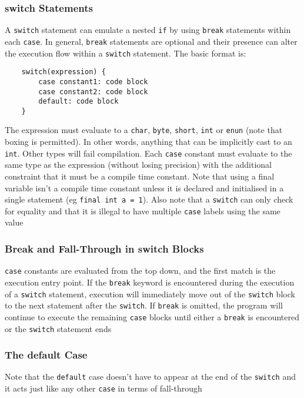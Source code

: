 \subsubsection{switch Statements}
A \verb#switch# statement can emulate a nested \verb#if# by using \verb#break# 
statements within each \verb#case#. In general, \verb#break# statements are 
optional and their presence can alter the execution flow within a \verb#switch# 
statement. The basic format is:
\begin{verbatim}
    switch(expression) {
        case constant1: code block
        case constant2: code block
        default: code block
    }
\end{verbatim}
The expression must evaluate to a \verb#char#, \verb#byte#, \verb#short#, 
\verb#int# or \verb#enun# (note that boxing is permitted). In other words, 
anything that can be implicitly cast to an \verb#int#. Other types will fail 
compilation.  Each \verb#case# constant must evaluate to the same type as the 
expression (without losing precision) with the additional constraint that it 
must be a compile time constant. Note that using a final variable isn't a 
compile time constant unless it is declared and initialised in a single 
statement (eg \verb#final int a = 1#). Also note that a \verb#switch# can only 
check for equality and that it is illegal to have multiple \verb#case# labels 
using the same value

\subsubsection{Break and Fall-Through in switch Blocks}
\verb#case# constants are evaluated from the top down, and the first match is 
the execution entry point. If the \verb#break# keyword is encountered during 
the execution of a \verb#switch# statement, execution will immediately move out 
of the \verb#switch# block to the next statement after the \verb#switch#. If 
\verb#break# is omitted, the program will continue to execute the remaining 
\verb#case# blocks until either a \verb#break# is encountered or the 
\verb#switch# statement ends

\subsubsection{The default Case}
Note that the \verb#default# case doesn't have to appear at the end of the 
\verb#switch# and it acts just like any other \verb#case# in terms of 
fall-through

